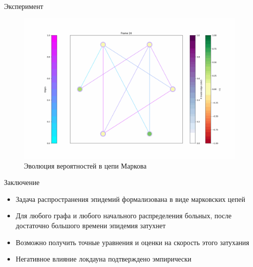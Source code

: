 		\begin{frame}{Эксперимент}
		\begin{figure}
			\includegraphics[width=\linewidth, keepaspectratio]{./img/24.png}
			\caption{Эволюция вероятностей в цепи Маркова}
		\end{figure}
	\end{frame}

	\begin{frame}{Заключение}
		\begin{itemize}
			\item Задача распространения эпидемий формализована в виде марковских цепей
			\item Для любого графа и любого начального распределения больных, после достаточно большого времени эпидемия затухнет
			\item Возможно получить точные уравнения и оценки на скорость этого затухания
			\item Негативное влияние локдауна подтверждено эмпирически 
		\end{itemize}
	\end{frame}
	
